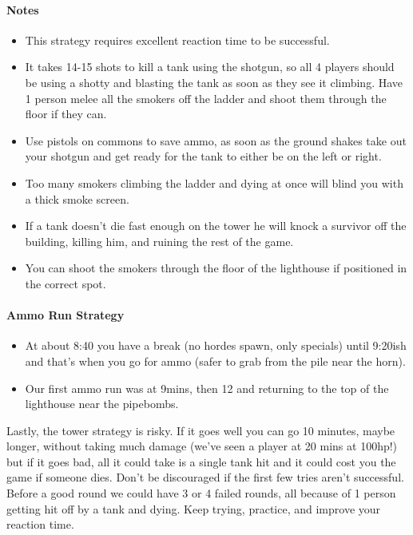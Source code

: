 \paragraph{Notes}
\begin{itemize}
\item This strategy requires excellent reaction time to be successful. 
\item It takes 14-15 shots to kill a tank using the shotgun, so all 4 players should be using a shotty and blasting the tank as soon as they see it climbing. Have 1 person melee all the smokers off the ladder and shoot them through the floor if they can.
\item Use pistols on commons to save ammo, as soon as the ground shakes take out your shotgun and get ready for the tank to either be on the left or right.
\item Too many smokers climbing the ladder and dying at once will blind you with a thick smoke screen.
\item If a tank doesn’t die fast enough on the tower he will knock a survivor off the building, killing him, and ruining the rest of the game.
\item You can shoot the smokers through the floor of the lighthouse if positioned in the correct spot.
\end{itemize}

\paragraph{Ammo Run Strategy}
\begin{itemize}
\item At about 8:40 you have a break (no hordes spawn, only specials) until 9:20ish and that's when you go for ammo (safer to grab from the pile near the horn).
\item Our first ammo run was at 9mins, then 12 and returning to the top of the lighthouse near the pipebombs.
\end{itemize}

Lastly, the tower strategy is risky. If it goes well you can go 10 minutes, maybe longer, without taking much damage (we've seen a player at 20 mins at 100hp!) but if it goes bad, all it could take is a single tank hit and it could cost you the game if someone dies. Don't be discouraged if the first few tries aren't successful. Before a good round we could have 3 or 4 failed rounds, all because of 1 person getting hit off by a tank and dying. Keep trying, practice, and improve your reaction time.

